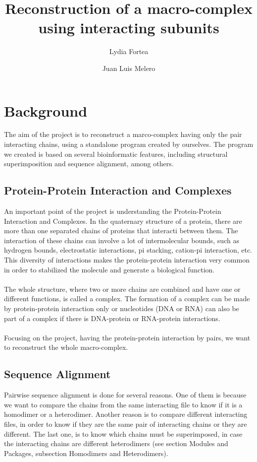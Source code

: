 \documentclass[a4paper,10pt]{report}
\title{Reconstruction of a macro-complex using interacting subunits}
\author{Lydia Fortea \and Juan Luis Melero}
\date{}
\begin{document}
\maketitle
\tableofcontents{}

\chapter{Background}

The aim of the project is to reconstruct a marco-complex having only the pair interacting chains, using a standalone program created by ourselves.
The program we created is based on several bioinformatic features, including structural superimposition and sequence alignment, among others.

\section{Protein-Protein Interaction and Complexes}

An important point of the project is understanding the Protein-Protein Interaction and Complexes. In the quaternary structure of a protein, there are more than one separated chains of proteins that interacti between them.
The interaction of these chains can involve a lot of intermolecular bounds, such as hydrogen bounds, electrostatic interactions, pi stacking, cation-pi interaction, etc. This diversity of interactions makes the protein-protein interaction
very common in order to stabilized the molecule and generate a biological function.\\\\
The whole structure, where two or more chains are combined and have one or different functions, is called a complex. The formation of a complex can be made by protein-protein interaction only or nucleotides (DNA or RNA) can also be part of a complex if there is DNA-protein or RNA-protein interactions.\\\\
Focusing on the project, having the protein-protein interaction by pairs, we want to reconstruct the whole macro-complex.

\section{Sequence Alignment}

Pairwise sequence alignment is done for several reasons. One of them is because we want to compare the chains from the same interacting file to know if it is a homodimer or a heterodimer. Another reason is to compare different interacting files, in order to know if they are the same pair of interacting chains or they are different. The last one, is to know which chains must be superimposed, in case the interacting chains are different heterodimers (see section Modules and Packages, subsection Homodimers and Heterodimers).
\end{document}
